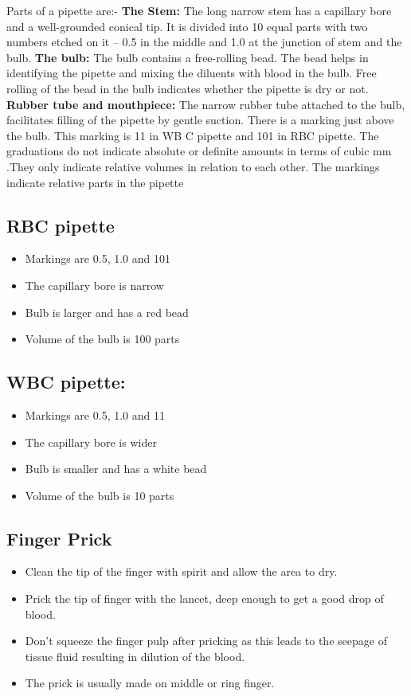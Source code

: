 \documentclass[a4paper,12pt]{book}
\begin{document}
Parts of a pipette are:-\newline
\textbf{The Stem:}
The long narrow stem has a capillary bore and a well-grounded conical tip. It is divided into 10 equal parts with two numbers etched on it – 0.5 in the middle and 1.0 at the junction of stem and the bulb.\newline
\textbf{The bulb:}
The bulb contains a free-rolling bead. The bead helps in identifying the pipette and mixing the diluents with blood in the bulb. Free rolling of the bead in the bulb indicates whether the pipette is dry or not.\newline
\textbf{Rubber tube and mouthpiece:}
The narrow rubber tube attached to the bulb, facilitates filling of the pipette by gentle suction. There is a marking just above the bulb. This marking is 11 in WB C pipette and 101 in RBC pipette. The graduations do not indicate absolute or definite amounts in terms of cubic mm .They only indicate relative volumes in relation to each other. The markings indicate relative parts in the pipette\newline

\subsection*{RBC pipette}
\begin{itemize}

\item{Markings are 0.5, 1.0 and 101}
\item{The capillary bore is narrow}
\item{Bulb is larger and has a red bead}
\item{Volume of the bulb is 100 parts}
\end{itemize}

\subsection*{WBC pipette:}
\begin{itemize}
\item{Markings are 0.5, 1.0 and 11}
\item{The capillary bore is wider}
\item{Bulb is smaller and has a white bead}
\item{Volume of the bulb is 10 parts}
\end{itemize}


\subsection*{Finger Prick}
\begin{itemize}
\item{Clean the tip of the finger with spirit and allow the area to dry.}
\item{Prick the tip of finger with the lancet, deep enough to get a good drop of blood.}
\item{Don’t squeeze the finger pulp after pricking as this leads to the seepage of tissue fluid resulting in dilution of the blood.}
\item{The prick is usually made on middle or ring finger.}
\end{itemize}
\end{document}
